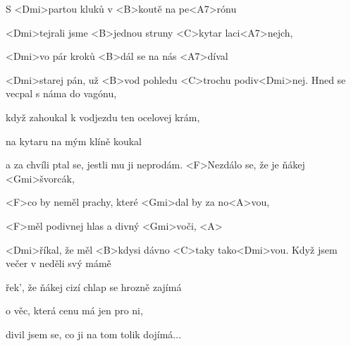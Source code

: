

\zs
S <Dmi>partou kluků v <B>koutě na pe<A7>rónu

<Dmi>tejrali jsme <B>jednou struny <C>kytar laci<A7>nejch,

<Dmi>vo pár kroků <B>dál se na nás <A7>díval

<Dmi>starej pán, už <B>vod pohledu <C>trochu podiv<Dmi>nej.
\ks
\zs
Hned se vecpal s náma do vagónu,

když zahoukal k vodjezdu ten ocelovej krám,

na kytaru na mým klíně koukal

a za chvíli ptal se, jestli mu ji neprodám.
\ks
\zr
<F>Nezdálo se, že je ňákej <Gmi>švorcák,

<F>co by neměl prachy, které <Gmi>dal by za no<A>vou,

<F>měl podivnej hlas a divný <Gmi>voči, <A>

<Dmi>říkal, že měl <B>kdysi dávno <C>taky tako<Dmi>vou.
\kr
\zs
{}
\ks
\zr \kr
\zs
Když jsem večer v neděli svý mámě

řek', že ňákej cizí chlap se hrozně zajímá

o věc, která cenu má jen pro ni,

divil jsem se, co ji na tom tolik dojímá...
\ks
\kp
